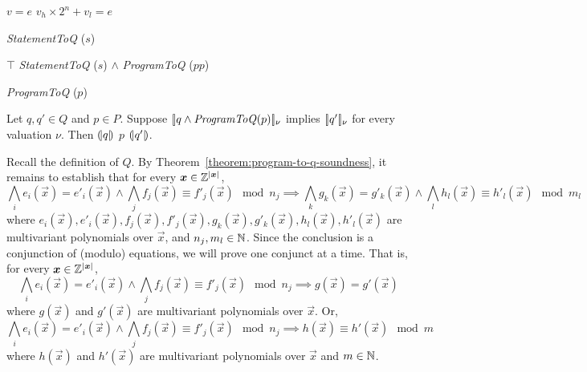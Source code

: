 
\begin{algorithm}
  \begin{algorithmic}[1]
        \Return $v = e$
      \EndCase
        \Return $v_h \times 2^n + v_l = e$
      \EndCase
    \EndMatch
  \end{algorithmic}
  \caption{\textit{StatementToQ} ($s$)}
\end{algorithm}

\begin{algorithm}
  \begin{algorithmic}[1]
      \Case{$\epsilon$} \Return $\top$ \EndCase
        \Return \textit{StatementToQ} ($s$) $\wedge$
                \textit{ProgramToQ} ($pp$)
      \EndCase
    \EndMatch
  \end{algorithmic}
  \caption{\textit{ProgramToQ} ($p$)}
\end{algorithm}

\begin{theorem}
  \label{theorem:program-to-q-soundness}
  Let $q, q' \in Q$ and $p \in P$.
  Suppose $[\!|{q \wedge \textmd{\textit{ProgramToQ}}(p)}|\!]_\nu$
  implies $[\!|{q'}|\!]_\nu$ for every valuation $\nu$. 
  Then ${(\!|}{q}{|\!)}$ $p$ ${(\!|}{q'}{|\!)}$.
\end{theorem}

Recall the definition of $Q$. By
Theorem~\ref{theorem:program-to-q-soundness}, it remains to establish
that for every $\vec{x} \in \bbfZ^{|\vec{x}|}$, 
\[
  \bigwedge\limits_i e_i (\vec{x}) = e'_i (\vec{x}) \wedge
  \bigwedge\limits_j f_j (\vec{x}) \equiv f'_j (\vec{x}) \mod n_j
  \implies
  \bigwedge\limits_k g_k (\vec{x}) = g'_k (\vec{x}) \wedge
  \bigwedge\limits_l   h_l (\vec{x}) \equiv h'_l (\vec{x}) \mod m_l
\]
where
$e_i (\vec{x}), e'_i (\vec{x}), f_j (\vec{x}), f'_j (\vec{x}),
 g_k (\vec{x}), g'_k (\vec{x}), h_l (\vec{x}), h'_l (\vec{x})$
are multivariant polynomials over $\vec{x}$, and
$n_j, m_l \in \mathbb{N} $. Since the conclusion is a conjunction of
(modulo) equations, we will prove one conjunct at a time. That is, for
every $\vec{x} \in \bbfZ^{|\vec{x}|}$, 
\[
  \bigwedge\limits_i e_i (\vec{x}) = e'_i (\vec{x}) \wedge
  \bigwedge\limits_j f_j (\vec{x}) \equiv f'_j (\vec{x}) \mod n_j
  \implies
  g (\vec{x}) = g' (\vec{x})
\] where $g (\vec{x})$ and $g' (\vec{x})$ are multivariant polynomials
over $\vec{x}$. Or,
\[
  \bigwedge\limits_i e_i (\vec{x}) = e'_i (\vec{x}) \wedge
  \bigwedge\limits_j f_j (\vec{x}) \equiv f'_j (\vec{x}) \mod n_j
  \implies
  h (\vec{x}) \equiv h' (\vec{x}) \mod m
\] where $h (\vec{x})$ and $h' (\vec{x})$ are multivariant polynomials
over $\vec{x}$ and $m \in \mathbb{N}$.
